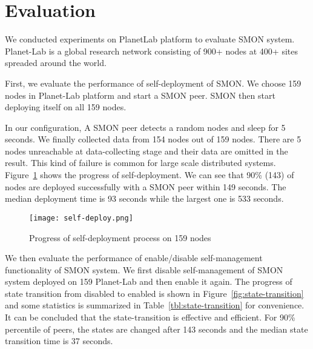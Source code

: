 \section{Evaluation}
\label{sec:eval}

We conducted experiments on PlanetLab platform to evaluate
SMON system. Planet-Lab is a global research network
consisting of 900+ nodes at 400+ sites spreaded around the
world.

%

First, we evaluate the performance of self-deployment of
SMON.  We choose 159 nodes in Planet-Lab platform and start
a SMON peer. SMON then start deploying itself on all 159
nodes.

In our configuration, A SMON peer detects a random nodes and
sleep for 5 seconds. We finally collected data from 154
nodes out of 159 nodes. There are 5 nodes unreachable at
data-collecting stage and their data are omitted in the
result. This kind of failure is common for large scale
distributed systems.  Figure~\ref{fig:self-deploy} shows the
progress of self-deployment. We can see that 90\% (143) of
nodes are deployed successfully with a SMON peer within 149
seconds. The median deployment time is 93 seconds while the
largest one is 533 seconds. 

\begin{figure}
\centering
\texttt{[image: self-deploy.png]}
\caption{Progress of self-deployment process on 159
nodes}
\label{fig:self-deploy}
\end{figure}

We then evaluate the performance of enable/disable
self-management functionality of SMON system. We first
disable self-management of SMON system deployed on 159
Planet-Lab and then enable it again. The progress of state
transition from disabled to enabled is shown in
Figure~\ref{fig:state-transition} and some statistics is
summarized in Table~\ref{tbl:state-transition} for
convenience. It can be concluded that the state-transition
is effective and efficient. For 90\% percentile of peers,
the states are changed after 143 seconds and the median
state transition time is 37 seconds.


